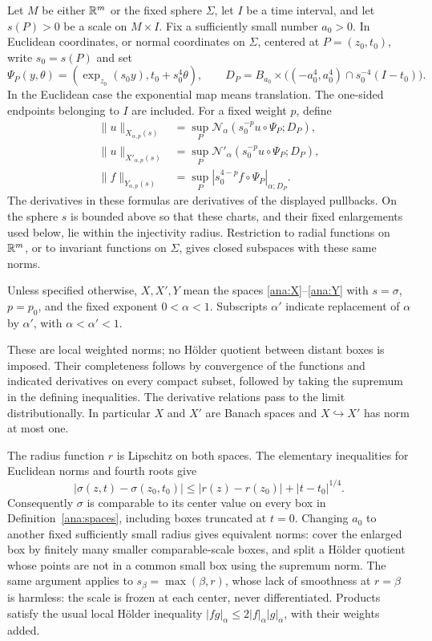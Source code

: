 \begin{definition}\label{ana:spaces}
Let $M$ be either $\mathbb{R}^m$ or the fixed sphere $\Sigma$, let $I$ be a time
interval, and let $s(P)>0$ be a scale on $M\times I$.  Fix a sufficiently
small number $a_0>0$.  In Euclidean coordinates, or normal coordinates
on $\Sigma$, centered at $P=(z_0,t_0)$, write $s_0=s(P)$ and set
\[
 \Psi_P(y,\theta)=(\exp_{z_0}(s_0y),t_0+s_0^4\theta),\qquad
 D_P=B_{a_0}\times
       \bigl((-a_0^4,a_0^4)\cap s_0^{-4}(I-t_0)\bigr).
\]
In the Euclidean case the exponential map means translation.  The
one-sided endpoints belonging to $I$ are included.  For a fixed weight
$p$, define
\begin{align}
 \|u\|_{X_{\alpha,p}(s)}
   &=\sup_P\mathcal N_\alpha(s_0^{-p}u\circ\Psi_P;D_P),\label{ana:X}\\
 \|u\|_{X'_{\alpha,p}(s)}
   &=\sup_P\mathcal N'_\alpha(s_0^{-p}u\circ\Psi_P;D_P),\label{ana:Xprime}\\
 \|f\|_{Y_{\alpha,p}(s)}
   &=\sup_P|s_0^{4-p}f\circ\Psi_P|_{\alpha;D_P}.
                                                        \label{ana:Y}
\end{align}
The derivatives in these formulas are derivatives of the displayed
pullbacks.  On the sphere $s$ is bounded above so that these charts,
and their fixed enlargements used below, lie within the injectivity
radius.  Restriction to radial functions on $\mathbb{R}^m$, or to invariant
functions on $\Sigma$, gives closed subspaces with these same norms.

Unless specified otherwise, $X,X',Y$ mean the spaces
\eqref{ana:X}--\eqref{ana:Y} with $s=\sigma$, $p=p_0$, and the
fixed exponent $0<\alpha<1$.  Subscripts $\alpha'$ indicate replacement
of $\alpha$ by $\alpha'$, with $\alpha<\alpha'<1$.
\end{definition}

These are local weighted norms; no H\"older quotient between distant
boxes is imposed.  Their completeness follows by convergence of the
functions and indicated derivatives on every compact subset, followed
by taking the supremum in the defining inequalities.  The derivative
relations pass to the limit distributionally.  In particular $X$ and
$X'$ are Banach spaces and $X\hookrightarrow X'$ has norm at most one.

The radius function $r$ is Lipschitz on both spaces.  The elementary
inequalities for Euclidean norms and fourth roots give
\[
 |\sigma(z,t)-\sigma(z_0,t_0)|
 \le |r(z)-r(z_0)|+|t-t_0|^{1/4}.
\]
Consequently $\sigma$ is comparable to its center value on every box
in Definition~\ref{ana:spaces}, including boxes truncated at $t=0$.
Changing $a_0$ to another fixed sufficiently small radius gives
equivalent norms: cover the enlarged box by finitely many smaller
comparable-scale boxes, and split a H\"older quotient whose points
are not in a common small box using the supremum norm.  The same
argument applies to $s_\beta=\max(\beta,r)$, whose lack of smoothness
at $r=\beta$ is harmless: the scale is frozen at each center, never
differentiated.  Products satisfy the usual local H\"older inequality
$|fg|_\alpha\le 2|f|_\alpha|g|_\alpha$, with their weights added.

